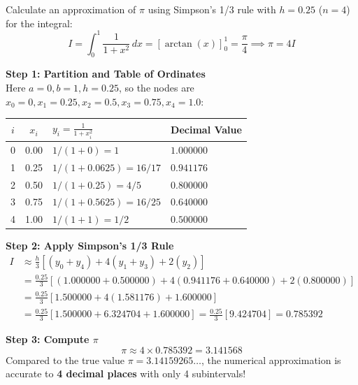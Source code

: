 \begin{examplebox}
Calculate an approximation of $\pi$ using Simpson's 1/3 rule with $h = 0.25$ ($n = 4$) for the integral:
\begin{equation}
    I = \int_{0}^{1} \frac{1}{1 + x^2} \, dx = \left[ \arctan(x) \right]_0^1 = \frac{\pi}{4} \implies \pi = 4 I
\end{equation}

\textbf{Step 1: Partition and Table of Ordinates} \\
Here $a = 0, b = 1, h = 0.25$, so the nodes are $x_0 = 0, x_1 = 0.25, x_2 = 0.5, x_3 = 0.75, x_4 = 1.0$:
\begin{center}
\renewcommand{\arraystretch}{1.3}
\begin{tabular}{|c|c|l|l|}
\hline
$i$ & $x_i$ & $y_i = \frac{1}{1 + x_i^2}$ & Decimal Value \\ \hline
0 & 0.00 & $1 / (1 + 0) = 1$ & $1.000000$ \\
1 & 0.25 & $1 / (1 + 0.0625) = 16/17$ & $0.941176$ \\
2 & 0.50 & $1 / (1 + 0.25) = 4/5$ & $0.800000$ \\
3 & 0.75 & $1 / (1 + 0.5625) = 16/25$ & $0.640000$ \\
4 & 1.00 & $1 / (1 + 1) = 1/2$ & $0.500000$ \\ \hline
\end{tabular}
\end{center}

\textbf{Step 2: Apply Simpson's 1/3 Rule}
\begin{align}
    I &\approx \frac{h}{3} \left[ (y_0 + y_4) + 4(y_1 + y_3) + 2(y_2) \right] \nonumber \\
    &= \frac{0.25}{3} \left[ (1.000000 + 0.500000) + 4(0.941176 + 0.640000) + 2(0.800000) \right] \nonumber \\
    &= \frac{0.25}{3} \left[ 1.500000 + 4(1.581176) + 1.600000 \right] \nonumber \\
    &= \frac{0.25}{3} \left[ 1.500000 + 6.324704 + 1.600000 \right] = \frac{0.25}{3} [9.424704] = 0.785392
\end{align}

\textbf{Step 3: Compute $\pi$}
\begin{equation}
    \pi \approx 4 \times 0.785392 = \boxed{3.141568}
\end{equation}
Compared to the true value $\pi = 3.14159265\dots$, the numerical approximation is accurate to \textbf{4 decimal places} with only 4 subintervals!
\end{examplebox}
